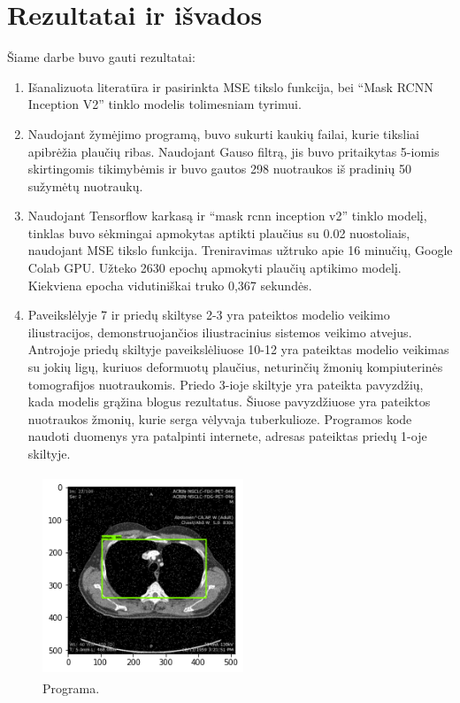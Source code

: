 \documentclass{VUMIFInfKursinis}
\begin{document}
\section{Rezultatai ir išvados}
\par
Šiame darbe buvo gauti rezultatai:
\begin{enumerate}
\item Išanalizuota literatūra ir pasirinkta MSE tikslo funkcija, bei \enquote{Mask RCNN Inception V2} tinklo modelis tolimesniam tyrimui.
\item Naudojant žymėjimo programą, buvo sukurti kaukių
failai, kurie tiksliai apibrėžia plaučių ribas. Naudojant
Gauso filtrą, jis buvo pritaikytas 5-iomis skirtingomis tikimybėmis ir buvo gautos 298 nuotraukos iš pradinių 50 sužymėtų nuotraukų. 
\item Naudojant Tensorflow karkasą ir \enquote{mask rcnn inception v2} tinklo modelį, tinklas buvo sėkmingai
apmokytas aptikti plaučius su 0.02 nuostoliais, naudojant MSE tikslo funkcija. Treniravimas užtruko apie 16 minučių,
 Google Colab GPU. Užteko 2630 epochų apmokyti plaučių aptikimo modelį. Kiekviena epocha vidutiniškai truko 0,367 sekundės.
\item Paveikslėlyje 7 ir priedų skiltyse 2-3 yra pateiktos modelio veikimo iliustracijos, demonstruojančios iliustracinius sistemos veikimo atvejus. Antrojoje priedų skiltyje paveikslėliuose 10-12 yra pateiktas modelio veikimas su jokių ligų, kuriuos deformuotų plaučius, neturinčių žmonių kompiuterinės tomografijos nuotraukomis. Priedo 3-ioje skiltyje yra pateikta pavyzdžių, kada modelis grąžina blogus rezultatus. Šiuose pavyzdžiuose yra pateiktos nuotraukos žmonių, kurie serga vėlyvaja tuberkulioze. Programos kode naudoti
duomenys yra patalpinti internete, adresas pateiktas priedų 1-oje skiltyje.
\end{enumerate}

\begin{figure}[!h]
  \centering
  \includegraphics[width=6cm,height=6cm,keepaspectratio]{result1.png}
  \caption{Programa.}
  \label{fig:kaukė1}
\end{figure}
\end{document}
